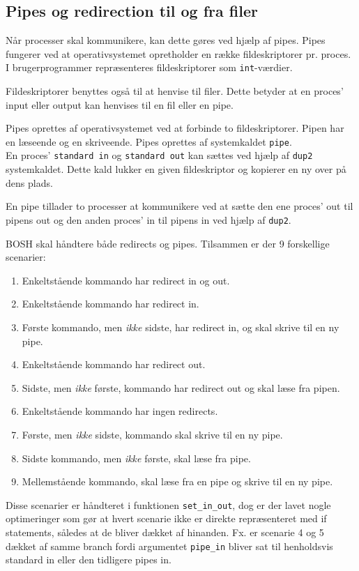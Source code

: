 \subsection{Pipes og redirection til og fra filer}
Når processer skal kommunikere, kan dette gøres ved hjælp af pipes. Pipes fungerer ved at operativsystemet opretholder en række fildeskriptorer pr. proces. I brugerprogrammer repræsenteres fildeskriptorer som \texttt{int}-værdier. 

Fildeskriptorer benyttes også til at henvise til filer. Dette betyder at en proces' input eller output kan henvises til en fil eller en pipe.

Pipes oprettes af operativsystemet ved at forbinde to fildeskriptorer. Pipen har en læseende og en skriveende. Pipes oprettes af systemkaldet \texttt{pipe}.\\

En proces' \texttt{standard in} og \texttt{standard out} kan sættes ved hjælp af \texttt{dup2} systemkaldet. Dette kald lukker en given fildeskriptor og kopierer en ny over på dens plads. 

En pipe tillader to processer at kommunikere ved at sætte den ene proces' out til pipens out og den anden proces' in til pipens in ved hjælp af \texttt{dup2}.

BOSH skal håndtere både redirects og pipes. Tilsammen er der 9 forskellige scenarier:
\begin{enumerate}
	\item Enkeltstående kommando har redirect in og out.
	\item Enkeltstående kommando har redirect in.
	\item Første kommando, men \textit{ikke} sidste, har redirect in, og skal skrive til en ny pipe.
	\item Enkeltstående kommando har redirect out.
	\item Sidste, men \textit{ikke} første, kommando har redirect out og skal læse fra pipen.
	\item Enkeltstående kommando har ingen redirects.
	\item Første, men \textit{ikke} sidste, kommando skal skrive til en ny pipe.
	\item Sidste kommando, men \textit{ikke} første, skal læse fra pipe.
	\item Mellemstående kommando, skal læse fra en pipe og skrive til en ny pipe.
\end{enumerate}

Disse scenarier er håndteret i funktionen \texttt{set\_in\_out}, dog er der lavet nogle optimeringer som gør at hvert scenarie ikke er direkte repræsenteret med if statements, således at de bliver dækket af hinanden. Fx. er scenarie 4 og 5 dækket af samme branch fordi argumentet \texttt{pipe\_in} bliver sat til henholdsvis standard in eller den tidligere pipes in.\\

